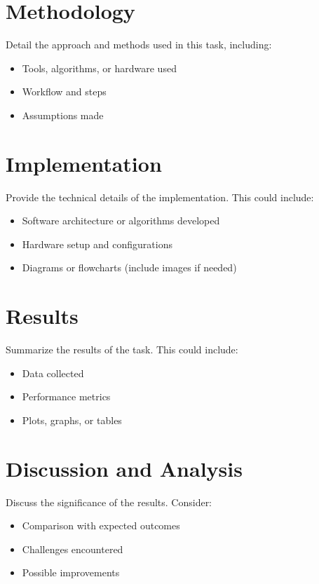 \documentclass[a4paper,12pt]{article}
\begin{document}
\section{Methodology}
\label{sec:methodology}
Detail the approach and methods used in this task, including:
\begin{itemize}
    \item Tools, algorithms, or hardware used
    \item Workflow and steps
    \item Assumptions made
\end{itemize}

\section{Implementation}
\label{sec:Implementation}
Provide the technical details of the implementation. This could include:
\begin{itemize}
    \item Software architecture or algorithms developed
    \item Hardware setup and configurations
    \item Diagrams or flowcharts (include images if needed)
\end{itemize}

\section{Results}
\label{sec:Results}
Summarize the results of the task. This could include:
\begin{itemize}
    \item Data collected
    \item Performance metrics
    \item Plots, graphs, or tables
\end{itemize}

\section{Discussion and Analysis}
\label{sec:Discussion and Analysis}
Discuss the significance of the results. Consider:
\begin{itemize}
    \item Comparison with expected outcomes
    \item Challenges encountered
    \item Possible improvements
\end{itemize}
\end{document}
